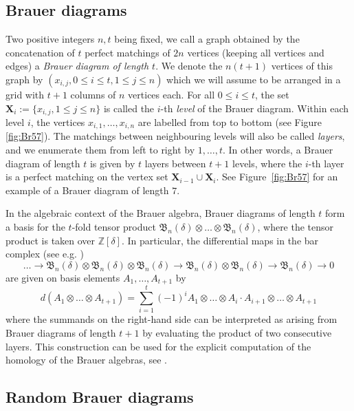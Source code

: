 \documentclass[a4paper,11pt,reqno]{amsart}
\newcommand{\Z}{\mathbb{Z}}
\newcommand{\kB}{\mathfrak{B}}
\theoremstyle{definition}
\begin{document}
\subsection*{Brauer diagrams}

Two positive integers $n,t$ being fixed, we call a graph obtained by the concatenation of $t$ perfect matchings of $2n$ vertices (keeping all vertices and edges) a \emph{Brauer diagram of length $t$}. We denote the $n(t+1)$ vertices of this graph by $(x_{i,j}, 0 \leq i \leq t, 1 \leq j \leq n)$ which we will assume to be arranged in a grid with $t+1$ columns of $n$ vertices each. For all $0 \leq i \leq t$, the set $\mathbf{X}_i := \{ x_{i,j}, 1 \leq j \leq n\}$ is called the $i$-th \emph{level} of the Brauer diagram. Within each level $i$, the vertices $x_{i,1},\dots,x_{i,n}$ are labelled from top to bottom (see Figure \ref{fig:Br57}). The matchings between neighbouring levels will also be called \emph{layers}, and we enumerate them from left to right by $1,\dots,t$. In other words, a Brauer diagram of length $t$ is given by $t$ layers between $t+1$ levels, where the $i$-th layer is a perfect matching on the vertex set $\mathbf{X}_{i-1} \cup \mathbf{X}_i$. See Figure~\ref{fig:Br57} for an example of a Brauer diagram of length $7$.

In the algebraic context of the Brauer algebra, Brauer diagrams of length $t$ form a basis for the $t$-fold tensor product $\kB_n(\delta)\otimes \dots\otimes \kB_n(\delta)$, where the tensor product is taken over $\Z[\delta]$. In particular, the differential maps in the bar complex (see e.g. \cite[Chapter IX.6]{CE56}) 
\[
 \dots \longrightarrow \kB_n(\delta)\otimes \kB_n(\delta) \otimes \kB_n(\delta) 
 \longrightarrow \kB_n(\delta) \otimes \kB_n(\delta)
 \longrightarrow \kB_n(\delta)
 \longrightarrow 0
\]
are given on basis elements $A_1,\dots,A_{t+1}$ by 
\[
 d(A_1\otimes \dots \otimes A_{t+1})=\sum_{i=1}^t (-1)^i A_1\otimes \dots \otimes A_i\cdot A_{i+1} \otimes \dots \otimes A_{t+1}
\]
where the summands on the right-hand side can be interpreted as arising from Brauer diagrams of length $t+1$ by evaluating the product of two consecutive layers. This construction can be used for the explicit computation of the homology of the Brauer algebras, see \cite{BHP21}.

\subsection*{Random Brauer diagrams}
\end{document}
